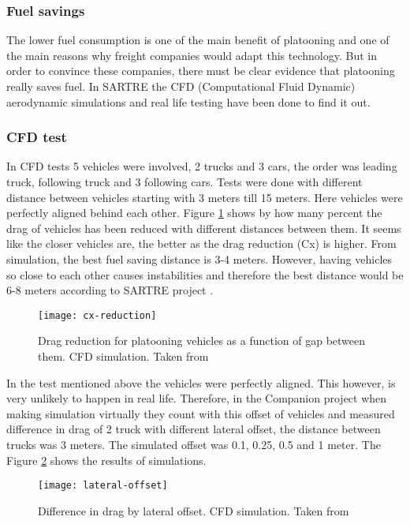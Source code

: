\subsubsection{Fuel savings}\label{sec:fuel-savings}
% 
The lower fuel consumption is one of the main benefit of platooning and one of the main reasons why freight companies would adapt this technology. But in order to convince these companies, there must be clear evidence that platooning really saves fuel. In SARTRE \cite{Chan2012ProjectSARTRE} the CFD (Computational Fluid Dynamic) aerodynamic simulations and real life testing have been done to find it out.
%
\subsubsection*{CFD test}
In CFD tests 5 vehicles were involved, 2 trucks and 3 cars, the order was leading truck, following truck and 3 following cars. Tests were done with different distance between vehicles starting with 3 meters till 15 meters. Here vehicles were perfectly aligned behind each other. Figure \ref{fig:cx-reduction} shows by how many percent the drag of vehicles has been reduced with different distances between them. It seems like the closer vehicles are, the better as the drag reduction (Cx) is higher. From simulation, the best fuel saving distance is 3-4 meters. However, having vehicles so close to each other causes instabilities and therefore the best distance would be 6-8 meters according to SARTRE project \cite[p. 33]{Chan2012ProjectSARTRE}.\par
% 
\begin{figure}[p]
    \centering
    \texttt{[image: cx-reduction]}
    \caption{Drag reduction for platooning vehicles as a function of gap between them. CFD simulation. Taken from \cite{Chan2012ProjectSARTRE}}
    \label{fig:cx-reduction}
\end{figure}
% 
In the test mentioned above the vehicles were perfectly aligned. This however, is very unlikely to happen in real life. Therefore, in the Companion project when making simulation virtually they count with this offset of vehicles and measured difference in drag of 2 truck with different lateral offset, the distance between trucks was 3 meters. The simulated offset was 0.1, 0.25, 0.5 and 1 meter. The Figure \ref{fig:lateral-offset} shows the results of simulations.
% 
\begin{figure}[p]
    \centering
    \texttt{[image: lateral-offset]}
    \caption{Difference in drag by lateral offset. CFD simulation. Taken from \cite[p. 19]{Laxhammar2015CooperativeConsumption}}
    \label{fig:lateral-offset}
\end{figure}
